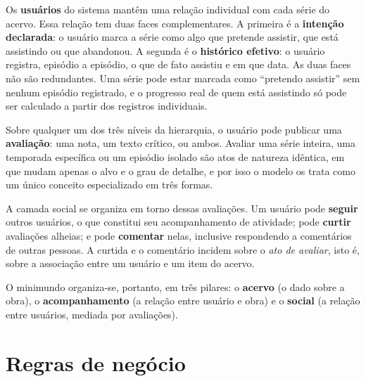 \documentclass[a4paper,12pt,oneside,openany]{book}
\newif\iforientacoes
\newcommand{\orientacao}[1]{%
    \iforientacoes
        \begin{quote}
        \small\itshape\textbf{Orientação:} #1
        \end{quote}
    \fi
}
\begin{document}
Os \textbf{usuários} do sistema mantêm uma relação individual com cada série do
acervo. Essa relação tem duas faces complementares. A primeira é a
\textbf{intenção declarada}: o usuário marca a série como algo que pretende
assistir, que está assistindo ou que abandonou. A segunda é o \textbf{histórico
efetivo}: o usuário registra, episódio a episódio, o que de fato assistiu e em que
data. As duas faces não são redundantes. Uma série pode estar marcada como
``pretendo assistir'' sem nenhum episódio registrado, e o progresso real de quem
está assistindo só pode ser calculado a partir dos registros individuais.

Sobre qualquer um dos três níveis da hierarquia, o usuário pode publicar uma
\textbf{avaliação}: uma nota, um texto crítico, ou ambos. Avaliar uma série
inteira, uma temporada específica ou um episódio isolado são atos de natureza
idêntica, em que mudam apenas o alvo e o grau de detalhe, e por isso o modelo os
trata como um único conceito especializado em três formas.

A camada social se organiza em torno dessas avaliações. Um usuário pode
\textbf{seguir} outros usuários, o que constitui seu acompanhamento de atividade;
pode \textbf{curtir} avaliações alheias; e pode \textbf{comentar} nelas, inclusive
respondendo a comentários de outras pessoas. A curtida e o comentário incidem sobre
o \emph{ato de avaliar}, isto é, sobre a associação entre um usuário e um item do
acervo.

O minimundo organiza-se, portanto, em três pilares: o \textbf{acervo} (o dado
sobre a obra), o \textbf{acompanhamento} (a relação entre usuário e obra) e o
\textbf{social} (a relação entre usuários, mediada por avaliações).

\section{Regras de negócio}\label{sec:regras}

\orientacao{Cada regra abaixo precisa ser rastreável até uma construção concreta
do banco. Ao escrever os Capítulos~\ref{cap:logica} e~\ref{cap:fisica}, citem o
código da regra (RN01, RN02, \dots) ao lado da restrição, do gatilho ou da chave
que a implementa. A Seção~\ref{sec:rastreabilidade} traz a tabela de
rastreabilidade a ser preenchida.}
\end{document}
